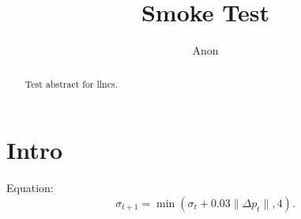 \documentclass[runningheads]{llncs}
\begin{document}
\title{Smoke Test}
\author{Anon}
\maketitle
\begin{abstract}Test abstract for llncs.\end{abstract}
\section{Intro}
Equation: \begin{equation}\sigma_{t+1}=\min(\sigma_t+0.03\|\Delta p_t\|,4).\end{equation}
\end{document}
